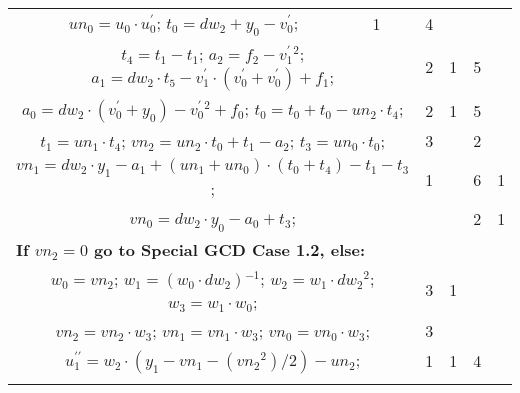 \begin{tabular}{|c|cr|c|c|c|c|}
{$un_0=u_0 \cdot u^{\prime}_0$;\hspace{4pt}
$t_0=dw_2+y_0-v^{\prime}_0$;\hspace{4pt}
} & 1 &  & 4 & \\
\multicolumn{3}{|R{340pt}|}{ 
$t_4=t_1-t_1$;\hspace{4pt}
$a_2=f_2-v^{\prime}_1{}^{2}$;\hspace{4pt}
$a_1=dw_2 \cdot t_5-v^{\prime}_1 \cdot (v^{\prime}_0+v^{\prime}_0)+f_1$;\hspace{4pt}
} & 2 & 1 & 5 & \\
\multicolumn{3}{|R{340pt}|}{ 
$a_0=dw_2 \cdot (v^{\prime}_0+y_0)-v^{\prime}_0{}^{2}+f_0$;\hspace{4pt}
$t_0=t_0+t_0-un_2 \cdot t_4$;\hspace{4pt}
} & 2 & 1 & 5 & \\
\multicolumn{3}{|R{340pt}|}{ 
$t_1=un_1 \cdot t_4$;\hspace{4pt}
$vn_2=un_2 \cdot t_0+t_1-a_2$;\hspace{4pt}
$t_3=un_0 \cdot t_0$;\hspace{4pt}
} & 3 &  & 2 & \\
\multicolumn{3}{|R{340pt}|}{ 
$vn_1=dw_2 \cdot y_1-a_1+(un_1+un_0) \cdot (t_0+t_4)-t_1-t_3$;\hspace{4pt}
} & 1 &  & 6 & 1\\
\multicolumn{3}{|R{340pt}|}{ 
$vn_0=dw_2 \cdot y_0-a_0+t_3$;\hspace{4pt}
} &  &  & 2 & 1\\
\multicolumn{3}{|l|}{ 
 \bf{If $vn_2 = 0$ go to Special GCD Case 1.2, else:} } &  &  &  & \\
\multicolumn{3}{|R{340pt}|}{ 
$w_0=vn_2$;\hspace{4pt}
$w_1=(w_0 \cdot dw_2){}^{-1}$;\hspace{4pt}
$w_2=w_1 \cdot dw_2{}^{2}$;\hspace{4pt}
$w_3=w_1 \cdot w_0$;\hspace{4pt}
} & 3 & 1 &  & \\
\multicolumn{3}{|R{340pt}|}{ 
$vn_2=vn_2 \cdot w_3$;\hspace{4pt}
$vn_1=vn_1 \cdot w_3$;\hspace{4pt}
$vn_0=vn_0 \cdot w_3$;\hspace{4pt}
} & 3 &  &  & \\
\multicolumn{3}{|R{340pt}|}{ 
$u^{\prime\prime}_1=w_2 \cdot (y_1-vn_1-(vn_2{}^{2})/2)-un_2$;\hspace{4pt}
} & 1 & 1 & 4 & \\
\multicolumn{3}{|R{340pt}|}{ 
}
\end{tabular}
